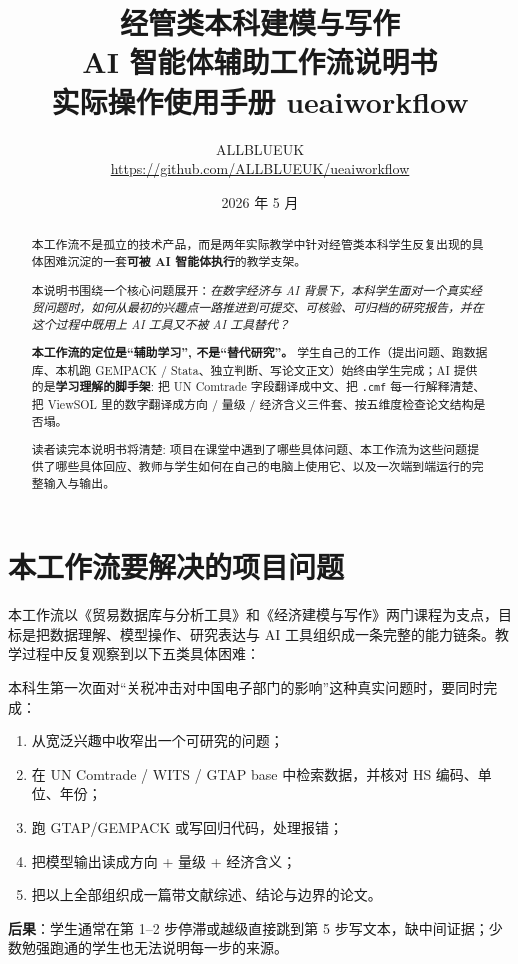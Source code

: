 \documentclass[12pt,a4paper]{article}
\title{\Huge 经管类本科建模与写作\\
AI 智能体辅助工作流说明书\\
\large 实际操作使用手册 \quad{} ueaiworkflow}
\author{ALLBLUEUK\\
\url{https://github.com/ALLBLUEUK/ueaiworkflow}}
\date{2026 年 5 月}
\begin{document}
\maketitle
\thispagestyle{empty}

\begin{abstract}
\noindent
本工作流不是孤立的技术产品，而是两年实际教学中针对经管类本科学生反复出现的具体困难沉淀的一套\textbf{可被 AI 智能体执行}的教学支架。

本说明书围绕一个核心问题展开：\emph{在数字经济与 AI 背景下，本科学生面对一个真实经贸问题时，如何从最初的兴趣点一路推进到可提交、可核验、可归档的研究报告，并在这个过程中既用上 AI 工具又不被 AI 工具替代？}

\textbf{本工作流的定位是``辅助学习'', 不是``替代研究''。} 学生自己的工作（提出问题、跑数据库、本机跑 GEMPACK / Stata、独立判断、写论文正文）始终由学生完成；AI 提供的是\textbf{学习理解的脚手架}: 把 UN Comtrade 字段翻译成中文、把 \texttt{.cmf} 每一行解释清楚、把 ViewSOL 里的数字翻译成方向 / 量级 / 经济含义三件套、按五维度检查论文结构是否塌。

读者读完本说明书将清楚: 项目在课堂中遇到了哪些具体问题、本工作流为这些问题提供了哪些具体回应、教师与学生如何在自己的电脑上使用它、以及一次端到端运行的完整输入与输出。
\end{abstract}

\tableofcontents
\newpage

\section{本工作流要解决的项目问题}

本工作流以《贸易数据库与分析工具》和《经济建模与写作》两门课程为支点，目标是把数据理解、模型操作、研究表达与 AI 工具组织成一条完整的能力链条。教学过程中反复观察到以下五类具体困难：

\begin{problembox}[问题 1：学生面对真实经贸问题时同时被五件事压住]
本科生第一次面对``关税冲击对中国电子部门的影响''这种真实问题时，要同时完成：
\begin{enumerate}[leftmargin=*]
  \item 从宽泛兴趣中收窄出一个可研究的问题；
  \item 在 UN Comtrade / WITS / GTAP base 中检索数据，并核对 HS 编码、单位、年份；
  \item 跑 GTAP/GEMPACK 或写回归代码，处理报错；
  \item 把模型输出读成方向 + 量级 + 经济含义；
  \item 把以上全部组织成一篇带文献综述、结论与边界的论文。
\end{enumerate}
\textbf{后果}：学生通常在第 1–2 步停滞或越级直接跳到第 5 步写文本，缺中间证据；少数勉强跑通的学生也无法说明每一步的来源。
\end{problembox}
\end{document}
